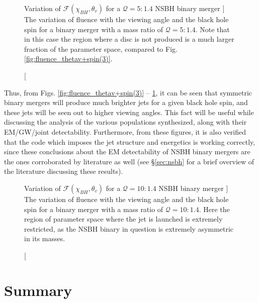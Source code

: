     \begin{figure}[H]
        \centering
        \def\svgwidth{0.8\linewidth}
        
        \caption
        [
            Variation of $\mathcal{F}(\chi_{BH}, \theta_{v})$ for a $\mathcal{Q}=5:1.4$
            NSBH binary merger
        ]
        {
            The variation of fluence with the viewing angle and the black hole spin for
            a binary merger with a mass ratio of $\mathcal{Q}=5:1.4$. Note that in this
            case the region where a disc is not produced is a much larger fraction of
            the parameter space, compared to Fig.\ref{fig:fluence_thetav+spin(3)}.
        }
        \label{fig:fluence_thetav+spin(5)}
    \end{figure}

    Thus, from Figs. \ref{fig:fluence_thetav+spin(3)} --
    \ref{fig:fluence_thetav+spin(5)}, it can be seen that symmetric binary mergers will
    produce much brighter jets for a given black hole spin, and these jets will be seen
    out to higher viewing angles. This fact will be useful while discussing the analysis
    of the various populations synthesized, along with their EM/GW/joint
    detectability.  Furthermore, from these figures, it is also verified that the code
    which imposes the jet structure and energetics is working correctly, since these
    conclusions about the EM detectability of NSBH binary mergers are the ones
    corroborated by literature as well (see \S\ref{sec:nsbh} for a brief overview of the
    literature discussing these results).

    \begin{figure}[ht]
        \centering
        \def\svgwidth{0.8\linewidth}
        
        \caption
        [
            Variation of $\mathcal{F}(\chi_{BH}, \theta_{v})$ for a $\mathcal{Q}=10:1.4$
            NSBH binary merger
        ]
        {
            The variation of fluence with the viewing angle and the black hole spin for
            a binary merger with a mass ratio of $\mathcal{Q}=10:1.4$. Here the region
            of parameter space where the jet is launched is extremely restricted, as the
            NSBH binary in question is extremely asymmetric in its masses.
        }
        \label{fig:fluence_thetav+spin(10)}
    \end{figure}

\section{Summary}

